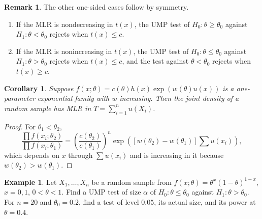 \documentclass[12pt,a4paper]{report}
\theoremstyle{definition}
\newtheorem{example}[thm]{Example}
\newtheorem{remark}[thm]{Remark}
\theoremstyle{plain}
\newtheorem{coro}[thm]{Corollary}
\begin{document}
\begin{remark}
\label{rem:mlrdirections}
The other one-sided cases follow by symmetry.
\begin{enumerate}
\item If the MLR is nondecreasing in $t(x)$, the UMP test of
$H_0\colon\theta\ge\theta_0$ against $H_1\colon\theta<\theta_0$ rejects when
$t(x)\le c$.
\item If the MLR is nonincreasing in $t(x)$, the UMP test of
$H_0\colon\theta\le\theta_0$ against $H_1\colon\theta>\theta_0$ rejects when
$t(x)\le c$, and the test against $\theta<\theta_0$ rejects when $t(x)\ge c$.
\end{enumerate}
\end{remark}

\begin{coro}
\label{cor:expfamilymlr}
Suppose $f(x;\theta) = c(\theta)h(x)\exp(w(\theta)u(x))$ is a
one-parameter exponential family with $w$ increasing. Then the joint density of a
random sample has MLR in $T = \sum_{i=1}^n u(X_i)$.
\end{coro}

\begin{proof}
For $\theta_1<\theta_2$,
\[\frac{\prod f(x_i;\theta_2)}{\prod f(x_i;\theta_1)}
= \left(\frac{c(\theta_2)}{c(\theta_1)}\right)^n
\exp\left([w(\theta_2) - w(\theta_1)]\sum u(x_i)\right),\]
which depends on $x$ through $\sum u(x_i)$ and is increasing in it because
$w(\theta_2)>w(\theta_1)$.
\end{proof}

\begin{example}
\label{ex:umpbernoulli}
Let $X_1,\dots,X_n$ be a random sample from $f(x;\theta) = \theta^x(1-\theta)^{1-x}$,
$x = 0,1$, $0<\theta<1$. Find a UMP test of size $\alpha$ of
$H_0\colon\theta\le\theta_0$ against $H_1\colon\theta>\theta_0$. For $n = 20$ and
$\theta_0 = 0.2$, find a test of level $0.05$, its actual size, and its power at
$\theta = 0.4$.
\end{example}
\end{document}
